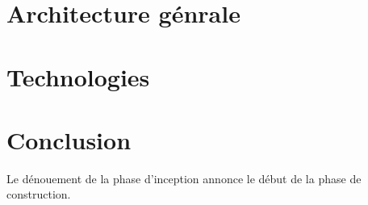 \begin{spacing}{1.5}
\section{Architecture génrale}



\section{Technologies}


\section*{Conclusion}
Le dénouement de la phase d'inception annonce le début de la phase de construction.

\end{spacing}

